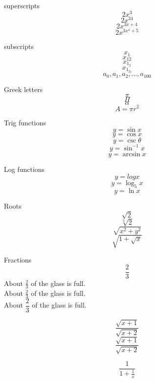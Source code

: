 \documentclass[11pt]{article}
\begin{document}
superscripts $$2x^3$$
$$2x^{34}$$
$$2x^{3x+4}$$
$$2x^{3x^4+5}$$

subscripts
$$x_1$$
$$x_{12}$$
$$x_{1_2}$$
$$x_{1_{2_3}}$$
$$a_0,a_1,a_2,\dots,a_{100}$$

Greek letters
$$\pi$$
$$\Pi$$
$$\alpha$$
$$A=\pi r^2$$

Trig functions
$$y= \sin x$$
$$y=\cos x$$
$$y=\csc \theta$$
$$y=\sin^{-1}x$$
$$y=\arcsin x$$

Log functions
$$y=log x$$
$$y=\log_5 x$$
$$y=\ln x$$

Roots
$$\sqrt{2}$$
$$\sqrt[3]{2}$$
$$\sqrt{x^2+y^2}$$
$$\sqrt{ 1+\sqrt{x} }$$

Fractions
$$\frac{2}{3}$$
About $\displaystyle \frac{2}{3}$ of the glass is full.\\[16pt]
About $\frac{2}{3}$ of the glass is full.\\[6pt]
About $\dfrac{2}{3}$ of the glass is full.

$$\frac{\sqrt{x+1}}{\sqrt{x+2}}$$
$$\frac{\sqrt{x+1}}{\sqrt{x+2}}$$

$$\frac{1}{ 1+\frac{1}{x}}$$
\end{document}

